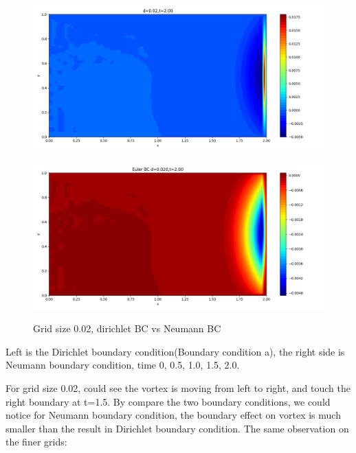 \documentclass[12pt]{article}
\begin{document}
\begin{figure}[H]
\begin{minipage}{\linewidth}
    \begin{minipage}{0.5\textwidth}
    \includegraphics[width=\linewidth]{figures/3d0.02t2.00.png}
    \label{fig1}
    \end{minipage}\hfill
    \begin{minipage}{0.5\textwidth}
    \includegraphics[width=\linewidth]{figures/3Ed0.020t2.00.png}
    \label{fig2}
    \end{minipage}
    \caption{Grid size 0.02, dirichlet BC vs Neumann BC}
    \end{minipage}
    
    \end{figure}

    Left is the 
    Dirichlet boundary condition(Boundary condition a), the 
    right side is Neumann boundary condition, time 0, 0.5, 1.0, 
    1.5, 2.0.
    
    For grid size 0.02, could see the vortex is moving from left
to right, and touch the right boundary at t=1.5. By compare 
the two boundary conditions, we could notice for Neumann 
boundary condition, the boundary effect on vortex is much
smaller than the result in Dirichlet boundary condition. The 
same observation on the finer grids:
\end{document}
